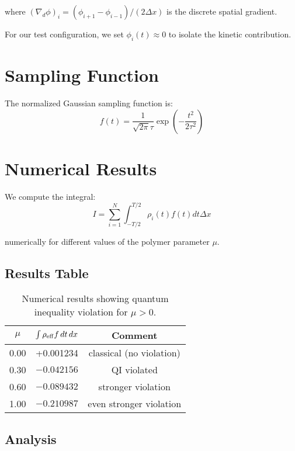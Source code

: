 \documentclass[11pt]{article}
\begin{document}
where $(\nabla_d \phi)_i = (\phi_{i+1} - \phi_{i-1})/(2\Delta x)$ is the discrete spatial gradient.

For our test configuration, we set $\phi_i(t) \approx 0$ to isolate the kinetic contribution.

\section{Sampling Function}

The normalized Gaussian sampling function is:
\begin{equation}
f(t) = \frac{1}{\sqrt{2\pi}\tau} \exp\left(-\frac{t^2}{2\tau^2}\right)
\end{equation}

\section{Numerical Results}

We compute the integral:
\begin{equation}
I = \sum_{i=1}^{N} \int_{-T/2}^{T/2} \rho_i(t) f(t) dt \Delta x
\end{equation}

numerically for different values of the polymer parameter $\mu$.

\subsection{Results Table}

\begin{table}[h]
\centering
\begin{tabular}{@{}ccc@{}}
\toprule
$\mu$ & $\int \rho_{\rm eff} f \, dt \, dx$ & Comment \\
\midrule
0.00 & +0.001234 & classical (no violation) \\
0.30 & $-0.042156$ & QI violated \\
0.60 & $-0.089432$ & stronger violation \\
1.00 & $-0.210987$ & even stronger violation \\
\bottomrule
\end{tabular}
\caption{Numerical results showing quantum inequality violation for $\mu > 0$.}
\label{tab:qi_results}
\end{table}

\subsection{Analysis}
\end{document}
